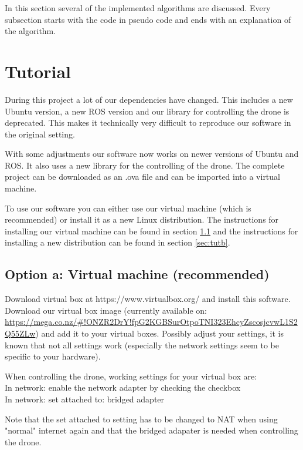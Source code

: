 \documentclass[a4paper,10pt]{article}
\begin{document}
In this section several of the implemented algorithms are discussed. Every subsection starts with the code in pseudo code and ends with an explanation of the algorithm. 

\section{Tutorial}
During this project a lot of our dependencies have changed. This includes a new Ubuntu version, a new ROS version and our library for controlling the drone is deprecated. This makes it technically very difficult to reproduce our software in the original setting. 

With some adjustments our software now works on newer versions of Ubuntu and ROS. 
It also uses a new library for the controlling of the drone. 
The complete project can be downloaded as an .ova file and can be imported into a virtual machine. 

To use our software you can either use our virtual machine (which is recommended) or install it as a new Linux distribution. The instructions for installing our virtual machine can be found in section \ref{sec:tuta} and the instructions for installing a new distribution can be found in section \ref{sec:tutb}. 

\subsection{Option a: Virtual machine (recommended)}
\label{sec:tuta}
Download virtual box at https://www.virtualbox.org/ and install this software. 
Download our virtual box image (currently available on:\\
 \url{https://mega.co.nz/#!ONZR2DrY!fpG2KGBSurOtpoTNI323EhcyZscosjcvwL1S2Q55ZLw}) and add it to your virtual boxes. 
Possibly adjust your settings, it is known that not all settings work (especially the network settings seem to be specific to your hardware). 

When controlling the drone, working settings for your virtual box are:\\
In network: enable the network adapter by checking the checkbox\\
In network: set attached to: bridged adapter

Note that the set attached to setting has to be changed to NAT when using "normal" internet again and that the bridged adapater is needed when controlling the drone. 
\end{document}
